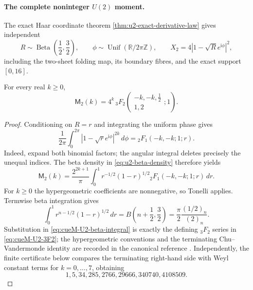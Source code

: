 \paragraph{The complete noninteger $U(2)$ moment.}
The exact Haar coordinate theorem \cref{thm:u2-exact-derivative-law} gives independent
\begin{equation}
 R\sim\operatorname{Beta}\!\left(\frac12,\frac32\right),
 \qquad \phi\sim\operatorname{Unif}(\mathbb R/2\pi\mathbb Z),
 \qquad X_2=4|1-\sqrt R e^{\mathrm i\phi}|^2,
 \label{eq:cueM-U2-law}
\end{equation}
including the two-sheet folding map, its boundary fibres, and the exact support $[0,16]$.

\begin{corollary}
\label{cor:cueM-U2-3F2}
For every real $k\geq0$,
\begin{equation}
 \mathsf M_2(k)=4^k\,{}_3F_2\!\left(
 \begin{matrix}-k,-k,\frac12\\1,2\end{matrix};1\right).
 \label{eq:cueM-U2-3F2}
\end{equation}
\end{corollary}

\begin{proof}
Conditioning on $R=r$ and integrating the uniform phase gives
\begin{equation}
 \frac1{2\pi}\int_0^{2\pi}|1-\sqrt r e^{\mathrm i\phi}|^{2k}\,d\phi
 ={}_2F_1(-k,-k;1;r).
 \label{eq:cueM-U2-angular}
\end{equation}
Indeed, expand both binomial factors; the angular integral deletes precisely the unequal
indices.  The beta density in \eqref{eq:u2-beta-density} therefore yields
\begin{equation}
 \mathsf M_2(k)=\frac{2^{2k+1}}\pi
 \int_0^1r^{-1/2}(1-r)^{1/2}{}_2F_1(-k,-k;1;r)\,dr.
 \label{eq:cueM-U2-beta-integral}
\end{equation}
For $k\geq0$ the hypergeometric coefficients are nonnegative, so Tonelli applies.  Termwise
beta integration gives
\[
 \int_0^1r^{n-1/2}(1-r)^{1/2}\,dr
 =B\!\left(n+\frac12,\frac32\right)
 =\frac\pi2\frac{(1/2)_n}{(2)_n}.
\]
Substitution in \eqref{eq:cueM-U2-beta-integral} is exactly the defining ${}_3F_2$ series in
\eqref{eq:cueM-U2-3F2}; the hypergeometric conventions and the terminating
Chu--Vandermonde identity are recorded in the canonical reference
\cite{oldeDaalhuisDLMF15}.  Independently, the finite certificate below compares the
terminating right-hand side with Weyl constant terms for $k=0,\ldots,7$, obtaining
\[
 1,5,34,285,2766,29666,340740,4108509.
\]
\end{proof}

